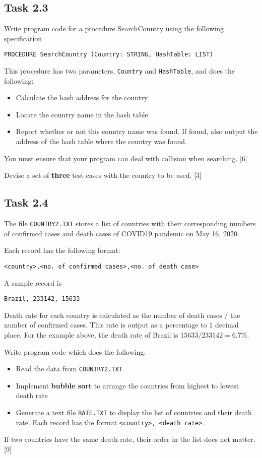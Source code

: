 \subsection*{Task 2.3 }

Write program code for a procedure SearchCountry using the following
specification 

\texttt{PROCEDURE SearchCountry (Country: STRING, HashTable: LIST)}

This procedure has two parameters, \texttt{Country} and \texttt{HashTable},
and does the following: 
\begin{itemize}
\item Calculate the hash address for the country 
\item Locate the country name in the hash table 
\item Report whether or not this country name was found. If found, also
output the address of the hash table where the country was found. 
\end{itemize}
You must ensure that your program can deal with collision when searching.
\hfill{}{[}6{]}

Devise a set of \textbf{three} test cases with the country to be used.
\hfill{} {[}3{]}

\subsection*{Task 2.4 }

The file \texttt{COUNTRY2.TXT} stores a list of countries with their
corresponding numbers of confirmed cases and death cases of COVID19
pandemic on May 16, 2020. 

Each record has the following format: 
\noindent \begin{center}
\texttt{<country>,<no. of confirmed cases>,<no. of death case> }
\par\end{center}

A sample record is 
\noindent \begin{center}
\texttt{Brazil, 233142, 15633 }
\par\end{center}

Death rate for each country is calculated as the number of death cases
/ the number of confirmed cases. This rate is output as a percentage
to 1 decimal place. For the example above, the death rate of Brazil
is $15633/233142=6.7\%$.

Write program code which does the following: 
\begin{itemize}
\item Read the data from \texttt{COUNTRY2.TXT }
\item Implement \textbf{bubble sort} to arrange the countries from highest
to lowest death rate 
\item Generate a text file \texttt{RATE.TXT} to display the list of countries
and their death rate. Each record has the format \texttt{<country>,
<death rate>}. 
\end{itemize}
If two countries have the same death rate, their order in the list
does not matter. \hfill{}{[}9{]}
